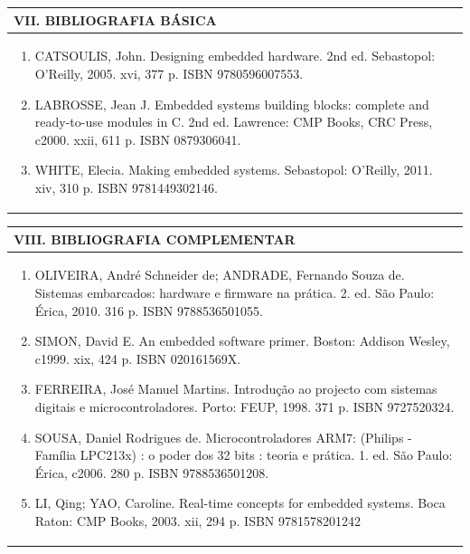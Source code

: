 \documentclass[12pt]{article}
\begin{document}
\begin{longtable}{|L{1.025\textwidth}|} \hline
%
{\bf VII. BIBLIOGRAFIA BÁSICA} \\ \hline
\begin{enumerate}
\item CATSOULIS, John. Designing embedded hardware. 2nd ed. Sebastopol: O'Reilly, 2005. xvi, 377 p. ISBN 9780596007553. 
\item LABROSSE, Jean J. Embedded systems building blocks: complete and ready-to-use modules in C. 2nd ed. Lawrence: CMP Books, CRC Press, c2000. xxii, 611 p. ISBN 0879306041. 
\item  WHITE, Elecia. Making embedded systems. Sebastopol: O'Reilly, 2011. xiv, 310 p. ISBN 9781449302146.
\end{enumerate}
 \\ \hline
\end{longtable}



\begin{longtable}{|L{1.025\textwidth}|} \hline
%
{\bf VIII. BIBLIOGRAFIA COMPLEMENTAR} \\ \hline
\begin{enumerate}
\item OLIVEIRA, André Schneider de; ANDRADE, Fernando Souza de. Sistemas embarcados: hardware e firmware na prática. 2. ed. São Paulo: Érica, 2010. 316 p. ISBN 9788536501055. 
\item SIMON, David E. An embedded software primer. Boston: Addison Wesley, c1999. xix, 424 p. ISBN 020161569X. 
\item  FERREIRA, José Manuel Martins. Introdução ao projecto com sistemas digitais e microcontroladores. Porto: FEUP, 1998. 371 p. ISBN 9727520324.
\item  SOUSA, Daniel Rodrigues de. Microcontroladores ARM7: (Philips - Família LPC213x) : o poder dos 32 bits : teoria e prática. 1. ed. São Paulo: Érica, c2006. 280 p. ISBN 9788536501208.
\item  LI, Qing; YAO, Caroline. Real-time concepts for embedded systems. Boca Raton: CMP Books, 2003. xii, 294 p. ISBN 9781578201242
%
\end{enumerate}
 \\ \hline
\end{longtable}



\end{document}
